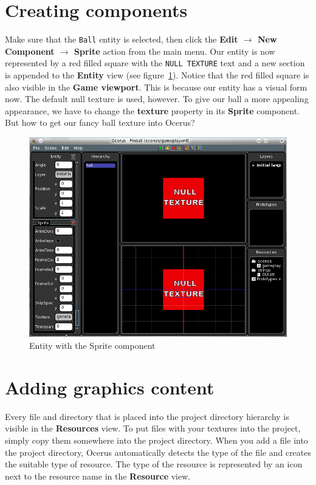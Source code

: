 \documentclass[a4paper,12pt]{article}
\begin{document}
\section{Creating components}
Make sure that the \texttt{Ball} entity is selected, then click the \textbf{Edit $\to$ New Component $\to$ Sprite} action from the main menu. Our entity is now represented by a red filled square with the \texttt{NULL TEXTURE} text and a new section is appended to the \textbf{Entity} view (see figure~\ref{fig:entity_with_sprite}). Notice that the red filled square is also visible in the \textbf{Game viewport}. This is because our entity has a visual form now. The default null texture is used, however. To give our ball a more appealing appearance, we have to change the \textbf{texture} property in its \textbf{Sprite} component. But how to get our fancy ball texture into Ocerus?

\begin{figure}[ht]
 \begin{center}
  \includegraphics[width=\textwidth]{EntityWithSprite}
 \end{center}
 \caption{Entity with the Sprite component}
 \label{fig:entity_with_sprite}
\end{figure}

\section{Adding graphics content}
Every file and directory that is placed into the project directory hierarchy is visible in the \textbf{Resources} view. To put files with your textures into the project, simply copy them somewhere into the project directory. When you add a file into the project directory, Ocerus automatically detects the type of the file and creates the suitable type of resource. The type of the resource is represented by an icon next to the resource name in the \textbf{Resource} view.
\end{document}
